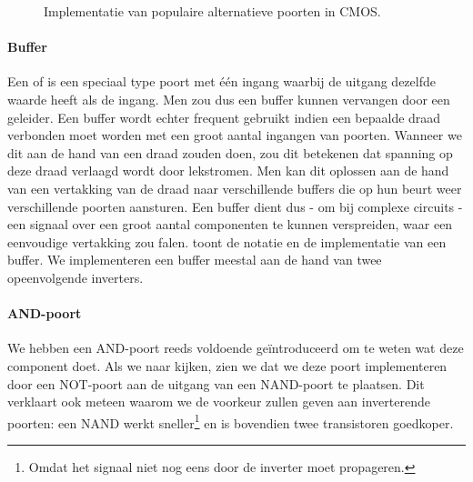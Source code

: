 \begin{figure}[hbt]
{
}
\caption{Implementatie van populaire alternatieve poorten in CMOS.}
\end{figure}

\paragraph{Buffer}
Een  of  is een speciaal type poort met \'e\'en ingang waarbij de uitgang dezelfde waarde heeft als de ingang. Men zou dus een buffer kunnen vervangen door een geleider. Een buffer wordt echter frequent gebruikt indien een bepaalde draad verbonden moet worden met een groot aantal ingangen van poorten. Wanneer we dit aan de hand van een draad zouden doen, zou dit betekenen dat spanning op deze draad verlaagd wordt door lekstromen. Men kan dit oplossen aan de hand van een vertakking van de draad naar verschillende buffers die op hun beurt weer verschillende poorten aansturen. Een buffer dient dus - om bij complexe circuits - een signaal over een groot aantal componenten te kunnen verspreiden, waar een eenvoudige vertakking zou falen.  toont de notatie en de implementatie van een buffer. We implementeren een buffer meestal aan de hand van twee opeenvolgende inverters.

\paragraph{AND-poort}
We hebben een AND-poort reeds voldoende ge\"introduceerd om te weten wat deze component doet. Als we naar  kijken, zien we dat we deze poort implementeren door een NOT-poort aan de uitgang van een NAND-poort te plaatsen. Dit verklaart ook meteen waarom we de voorkeur zullen geven aan inverterende poorten: een NAND werkt sneller\footnote{Omdat het signaal niet nog eens door de inverter moet propageren.} en is bovendien twee transistoren goedkoper.

